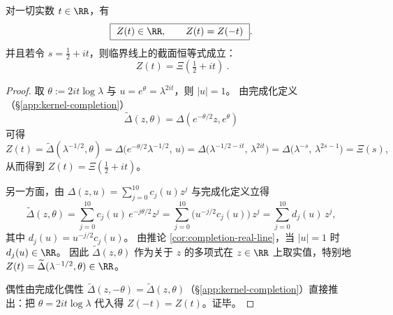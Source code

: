 \begin{proposition}\label{prop:kernel-hardy-real-even}
对一切实数 \(t\in\RR\)，有
$$
\boxed{\ Z(t)\in\RR,\qquad Z(t)=Z(-t)\ }.
$$
并且若令 \(s=\tfrac12+it\)，则临界线上的截面恒等式成立：
$$
\boxed{\ Z(t)=\Xi\!\left(\tfrac12+it\right)\ }.
$$
\end{proposition}
\begin{proof}
取 \(\theta:=2it\log\lambda\) 与 \(u=e^\theta=\lambda^{2it}\)，则 \(|u|=1\)。
由完成化定义（\S\ref{app:kernel-completion}）
\[
\widetilde{\Delta}(z,\theta)=\Delta(e^{-\theta/2}z,e^\theta)
\]
可得
\[
Z(t)=\widetilde{\Delta}(\lambda^{-1/2},\theta)
=\Delta\!\bigl(e^{-\theta/2}\lambda^{-1/2},\,u\bigr)
=\Delta\!\bigl(\lambda^{-1/2-it},\,\lambda^{2it}\bigr)
=\Delta\!\bigl(\lambda^{-s},\,\lambda^{2s-1}\bigr)
=\Xi(s),
\]
从而得到 \(Z(t)=\Xi(\tfrac12+it)\)。
\par
另一方面，由 \(\Delta(z,u)=\sum_{j=0}^{10}c_j(u)z^j\) 与完成化定义立得
\[
\widetilde{\Delta}(z,\theta)=\sum_{j=0}^{10}c_j(u)\,e^{-j\theta/2}z^j
=\sum_{j=0}^{10}\bigl(u^{-j/2}c_j(u)\bigr)\,z^j
=\sum_{j=0}^{10}d_j(u)\,z^j,
\]
其中 \(d_j(u)=u^{-j/2}c_j(u)\)。
由推论 \ref{cor:completion-real-line}，当 \(|u|=1\) 时 \(d_j(u)\in\RR\)。
因此 \(\widetilde{\Delta}(z,\theta)\) 作为关于 \(z\) 的多项式在 \(z\in\RR\) 上取实值，特别地 \(Z(t)=\widetilde{\Delta}(\lambda^{-1/2},\theta)\in\RR\)。
\par
偶性由完成化偶性 \(\widetilde{\Delta}(z,-\theta)=\widetilde{\Delta}(z,\theta)\)（\S\ref{app:kernel-completion}）直接推出：把 \(\theta=2it\log\lambda\) 代入得 \(Z(-t)=Z(t)\)。证毕。
\end{proof}

